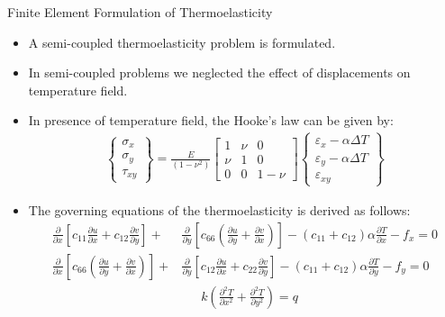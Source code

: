 \documentclass{beamer}
\begin{document}
\begin{frame}[t,fragile]{Finite Element Formulation of Thermoelasticity}
    \vspace{-.4cm}
    \begin{itemize} 
\item A semi-coupled thermoelasticity problem is formulated. 
\item In semi-coupled problems we neglected the effect of displacements on temperature field. 
\item In presence of temperature field, the Hooke's law can be given by: 
    \footnotesize
\begin{align*}
    \begin{Bmatrix}
        \sigma_{x}\\ \sigma_{y}\\ \tau_{xy} 
    \end{Bmatrix} =\frac{E}{(1-\nu^2)}
    \begin{bmatrix}
        1 & \nu & 0 \\ \nu & 1 & 0 \\ 0 & 0 & 1-\nu 
    \end{bmatrix}
    \begin{Bmatrix}
        \varepsilon_{x}-\alpha\Delta T \\ \varepsilon_{y}-\alpha \Delta T \\ \varepsilon_{xy} 
    \end{Bmatrix}
\end{align*}

    \item The governing equations of the thermoelasticity is derived as follows: 
            \bgroup
            \begin{align*}
    \frac{\partial}{\partial x}\left[c_{11}\frac{\partial u}{\partial x}+c_{12}\frac{\partial v}{\partial y}\right]+&\frac{\partial}{\partial y}\left[c_{66}\left(\frac{\partial u}{\partial y}+\frac{\partial v}{\partial x}\right)\right]-(c_{11}+c_{12})\alpha\frac{\partial T}{\partial x}-f_x   =0 \\
    \frac{\partial}{\partial x}\left[c_{66}\left(\frac{\partial u}{\partial y}+\frac{\partial v}{\partial x}\right)\right]+&\frac{\partial}{\partial y}\left[c_{12}\frac{\partial u}{\partial x}+c_{22}\frac{\partial v}{\partial y}\right]-(c_{11}+c_{12})\alpha\frac{\partial T}{\partial y}-f_y=0\\
    &\ \ \ \ \ \ \ k\left( \frac{\partial^2 T}{\partial x^2}+\frac{\partial^2 T}{\partial y^2} \right)=q
\end{align*}
\egroup
       \end{itemize}
\end{frame}
\end{document}

